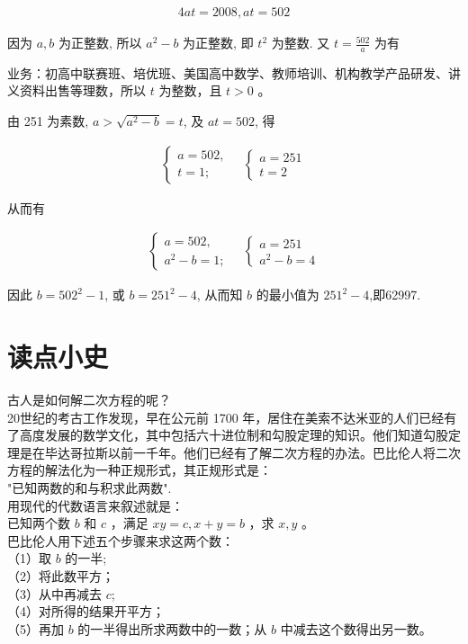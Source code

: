 \documentclass[10pt]{article}
\begin{document}
\begin{align*}
4 a t=2008, a t=502
\end{align*}

因为 $a, b$ 为正整数, 所以 $a^{2}-b$ 为正整数, 即 $t^{2}$ 为整数. 又 $t=\frac{502}{a}$ 为有

业务：初高中联赛班、培优班、美国高中数学、教师培训、机构教学产品研发、讲义资料出售等理数，所以 $t$ 为整数，且 $t>0$ 。

由 251 为素数, $a>\sqrt{a^{2}-b}=t$, 及 $a t=502$, 得

\begin{align*}
\left\{\begin{array} { l } 
{ a = 5 0 2 , } \\
{ t = 1 ; }
\end{array} \quad \left\{\begin{array}{l}
a=251 \\
t=2
\end{array}\right.\right.
\end{align*}

从而有

\begin{align*}
\left\{\begin{array} { l } 
{ a = 5 0 2 , } \\
{ a ^ { 2 } - b = 1 ; }
\end{array} \quad \left\{\begin{array}{l}
a=251 \\
a^{2}-b=4
\end{array}\right.\right.
\end{align*}

因此 $b=502^{2}-1$, 或 $b=251^{2}-4$, 从而知 $b$ 的最小值为 $251^{2}-4$,即62997.

\section*{读点小史}
古人是如何解二次方程的呢？\\
20世纪的考古工作发现，早在公元前 1700 年，居住在美索不达米亚的人们已经有了高度发展的数学文化，其中包括六十进位制和勾股定理的知识。他们知道勾股定理是在毕达哥拉斯以前一千年。他们已经有了解二次方程的办法。巴比伦人将二次方程的解法化为一种正规形式，其正规形式是：\\
"已知两数的和与积求此两数".\\
用现代的代数语言来叙述就是：\\
已知两个数 $b$ 和 $c$ ，满足 $x y=c, x+y=b$ ，求 $x, y$ 。\\
巴比伦人用下述五个步骤来求这两个数：\\
（1）取 $b$ 的一半;\\
（2）将此数平方；\\
（3）从中再减去 $c$;\\
（4）对所得的结果开平方；\\
（5）再加 $b$ 的一半得出所求两数中的一数；从 $b$ 中减去这个数得出另一数。
\end{document}
